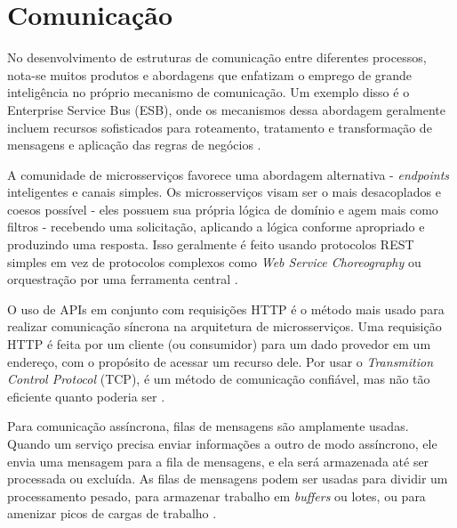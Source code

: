 

\section{Comunicação}\label{secao-comunicacao}


No desenvolvimento de estruturas de comunicação entre diferentes processos, nota-se muitos produtos e abordagens que enfatizam o emprego de grande inteligência no próprio mecanismo de comunicação. Um exemplo disso é o Enterprise Service Bus (ESB), onde os mecanismos dessa abordagem geralmente incluem recursos sofisticados para roteamento, tratamento e transformação de mensagens e aplicação das regras de negócios \cite{martin-fowler-microservices}.

A comunidade de microsserviços favorece uma abordagem alternativa - \emph{endpoints} inteligentes e canais simples. Os microsserviços visam ser o mais desacoplados e coesos possível - eles possuem sua própria lógica de domínio e agem mais como filtros - recebendo uma solicitação, aplicando a lógica conforme apropriado e produzindo uma resposta. Isso geralmente é feito usando protocolos REST simples em vez de protocolos complexos como \emph{Web Service Choreography} ou orquestração por uma ferramenta central \cite{martin-fowler-microservices}.

O uso de APIs em conjunto com requisições HTTP é o método mais usado para realizar comunicação síncrona na arquitetura de microsserviços. Uma requisição HTTP é feita por um cliente (ou consumidor) para um dado provedor em um endereço, com o propósito de acessar um recurso dele. Por usar o \emph{Transmition Control Protocol} (TCP), é um método de comunicação confiável, mas não tão eficiente quanto poderia ser \cite{martin-fowler-microservices}.

Para comunicação assíncrona, filas de mensagens são amplamente usadas. Quando um serviço precisa enviar informações a outro de modo assíncrono, ele envia uma mensagem para a fila de mensagens, e ela será armazenada até ser processada ou excluída. As filas de mensagens podem ser usadas para dividir um processamento pesado, para armazenar trabalho em \emph{buffers} ou lotes, ou para amenizar picos de cargas de trabalho \cite{amazon-filas-de-mensagens}.

